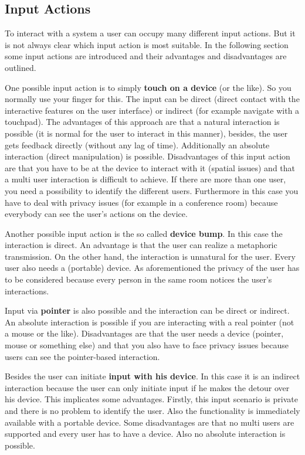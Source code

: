 \subsection{Input Actions}

To interact with a system a user can occupy many different input actions.
But it is not always clear which input action is most suitable.
In the following section some input actions are introduced and their advantages and disadvantages are outlined.

One possible input action is to simply \textbf{touch on a device} (or the like).
So you normally use your finger for this.
The input can be direct (direct contact with the interactive features on the user interface) or indirect (for example navigate with a touchpad).
The advantages of this approach are that a natural interaction is possible (it is normal for the user to interact in this manner), besides, the user gets feedback directly (without any lag of time). Additionally an absolute interaction (direct manipulation) is possible.
Disadvantages of this input action are that you have to be at the device to interact with it (spatial issues) and that a multi user interaction is difficult to achieve.
If there are more than one user, you need a possibility to identify the different users.
Furthermore in this case you have to deal with privacy issues (for example in a conference room) because everybody can see the user’s actions on the device.

Another possible input action is the so called \textbf{device bump}.
In this case the interaction is direct.
An advantage is that the user can realize a metaphoric transmission.
On the other hand, the interaction is unnatural for the user.
Every user also needs a (portable) device.
As aforementioned the privacy of the user has to be considered because every person in the same room notices the user’s interactions. 

Input via \textbf{pointer} is also possible and the interaction can be direct or indirect.
An absolute interaction is possible if you are interacting with a real pointer (not a mouse or the like).
Disadvantages are that the user needs a device (pointer, mouse or something else) and that you also have to face privacy issues because users can see the pointer-based interaction.

Besides the user can initiate \textbf{input with his device}.
In this case it is an indirect interaction because the user can only initiate input if he makes the detour over his device. This implicates some advantages.
Firstly, this input scenario is private and there is no problem to identify the user.
Also the functionality is immediately available with a portable device.
Some disadvantages are that no multi users are supported and every user has to have a device.
Also no absolute interaction is possible.

